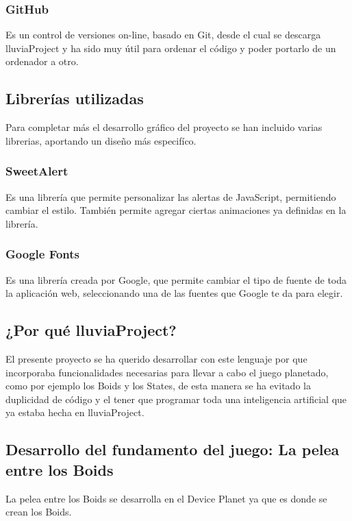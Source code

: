 \documentclass[a4paper,10pt]{article}
\begin{document}
\subsubsection{GitHub}
Es un control de versiones on-line, basado en Git, 
desde el cual se descarga lluviaProject y ha sido muy útil 
para ordenar el código y poder portarlo de un ordenador a otro.
\cleardoublepage

\subsection{Librerías utilizadas}

Para completar más el desarrollo gráfico del proyecto se han incluido varias librerias, aportando un diseño
más especifíco.

\subsubsection{SweetAlert}

Es una librería que permite personalizar las alertas de JavaScript, permitiendo cambiar el estilo.
También permite agregar ciertas animaciones ya definidas en la librería.

\subsubsection{Google Fonts}

Es una librería creada por Google, que permite cambiar el tipo de fuente de toda la aplicación web, 
seleccionando una de las fuentes que Google te da para elegir.
\cleardoublepage

\subsection{¿Por qué lluviaProject?}
El presente proyecto se ha querido desarrollar con este lenguaje por que incorporaba funcionalidades necesarias para llevar
a cabo el juego planetado, como por ejemplo los Boids y los States, de esta manera se ha evitado la duplicidad de código y el tener 
que programar toda una inteligencia artificial que ya estaba hecha en lluviaProject.

\subsection{Desarrollo del fundamento del juego: La pelea entre los Boids}
La pelea entre los Boids se desarrolla en el Device Planet ya que es donde se crean los Boids.
\end{document}

